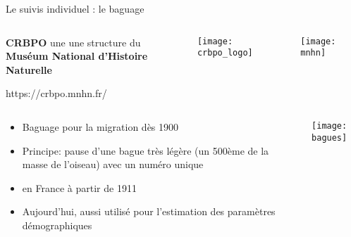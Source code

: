 \documentclass[10pt]{beamer}
\begin{document}
\begin{frame}{Le suivis individuel : le baguage}
  \begin{columns}[c]
    \begin{column}[c]{0.6\textwidth}
      \textbf{CRBPO} une une structure du \\\textbf{Muséum National d'Histoire
      Naturelle}\\
      \begin{tiny}
        https://crbpo.mnhn.fr/
      \end{tiny}
    \end{column}
    \begin{column}[c]{0.3\textwidth}
      \texttt{[image: crbpo\_logo]}
    \end{column}
    \begin{column}[c]{0.1\textwidth}
      \texttt{[image: mnhn]}
    \end{column}
  \end{columns}
  \begin{columns}[c]
    \begin{column}[c]{0.6\textwidth}
     \begin{itemize}[<+->]
  \item Baguage pour la migration dès 1900
  \item Principe: pause d'une bague très légère (un 500ème de la masse
    de l'oiseau) avec un numéro unique
  \item en France à partir de 1911
  \item Aujourd'hui, aussi utilisé pour l'estimation des paramètres démographiques
  \end{itemize}
    \end{column}
    \begin{column}[c]{0.4\textwidth}
      \begin{center}
        \texttt{[image: bagues]}
      \end{center}
    \end{column}
  \end{columns}

\end{frame}
\end{document}
